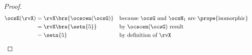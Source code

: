 \begin{tabstr}{0.75}
\begin{proof}
\begin{align*}
      \ocsE(\rvX)
        &= \rvX\brs{\ocscen(\ocsG)}
        &&\text{because $\ocsG$ and $\ocsH_1$ are \prope{isomorphic}}
      \\&= \rvX\brs{\setn{5}}
        &&\text{by $\ocscen(\ocsG)$ result}
      \\&= \setn{5}
        &&\text{by definition of $\rvX$}

\end{align*}
\end{proof}
\end{tabstr}
